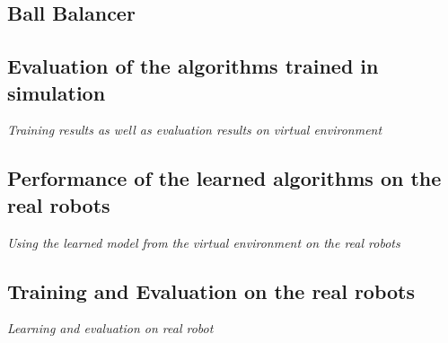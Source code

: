 \subsection{Ball Balancer}
\subsection{Evaluation of the algorithms trained in simulation}
\textit{Training results as well as evaluation results on virtual environment}
\subsection{Performance of the learned algorithms on the real robots}
\textit{Using the learned model from the virtual environment on the real robots}
\subsection{Training and Evaluation on the real robots}
\textit{Learning and evaluation on real robot}
